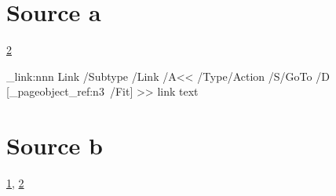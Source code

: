 \documentclass{article}
\begin{document}
\section{Source a}\label{a}
\ref{b}
\newpage 
\ExplSyntaxOn
\pdfannot_link:nnn { Link }
{
 /Subtype /Link
/A<<
/Type/Action
/S/GoTo
/D [\pdf_pageobject_ref:n{3}~/Fit]
>>
}
{ link text}
\ExplSyntaxOff

\newpage 
\section{Source b}\label{b}

\ref{a}, \ref{b} 
\end{document}
